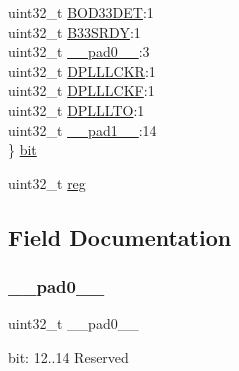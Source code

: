 \begin{DoxyCompactItemize}
\begin{tabbing}
\>uint32\_t \mbox{\hyperlink{union_s_y_s_c_t_r_l___i_n_t_e_n_s_e_t___type_afe0d01af66ae30fcd7f3c61067b2bef1}{BOD33DET}}:1\\
\>uint32\_t \mbox{\hyperlink{union_s_y_s_c_t_r_l___i_n_t_e_n_s_e_t___type_a001eb8c699a22ed1e8addd422b0068ae}{B33SRDY}}:1\\
\>uint32\_t \mbox{\hyperlink{union_s_y_s_c_t_r_l___i_n_t_e_n_s_e_t___type_a3e57c2ef1c3ffb36722f000cc1156824}{\_\_pad0\_\_}}:3\\
\>uint32\_t \mbox{\hyperlink{union_s_y_s_c_t_r_l___i_n_t_e_n_s_e_t___type_a0971d1b5df18859d93257da5c619eb64}{DPLLLCKR}}:1\\
\>uint32\_t \mbox{\hyperlink{union_s_y_s_c_t_r_l___i_n_t_e_n_s_e_t___type_ab73a8dbca12f32aad2cc241099afc49f}{DPLLLCKF}}:1\\
\>uint32\_t \mbox{\hyperlink{union_s_y_s_c_t_r_l___i_n_t_e_n_s_e_t___type_ac0397fe777ae420afce8c8ddc23dc843}{DPLLLTO}}:1\\
\>uint32\_t \mbox{\hyperlink{union_s_y_s_c_t_r_l___i_n_t_e_n_s_e_t___type_a6712ba6dd1d5b43d2d56ff8ac4e275a7}{\_\_pad1\_\_}}:14\\
\} \mbox{\hyperlink{union_s_y_s_c_t_r_l___i_n_t_e_n_s_e_t___type_ac90045c622fb8a197252a514063c5c84}{bit}}\\

\end{tabbing}\item 
uint32\+\_\+t \mbox{\hyperlink{union_s_y_s_c_t_r_l___i_n_t_e_n_s_e_t___type_a6b91636401516a477989a336376d7b40}{reg}}
\end{DoxyCompactItemize}


\subsection{Field Documentation}
\mbox{\label{union_s_y_s_c_t_r_l___i_n_t_e_n_s_e_t___type_a3e57c2ef1c3ffb36722f000cc1156824}} 
\subsubsection{\texorpdfstring{\_\_pad0\_\_}{\_\_pad0\_\_}}
{\footnotesize\ttfamily uint32\+\_\+t \+\_\+\+\_\+pad0\+\_\+\+\_\+}

bit\+: 12..14 Reserved \mbox{\label{union_s_y_s_c_t_r_l___i_n_t_e_n_s_e_t___type_a6712ba6dd1d5b43d2d56ff8ac4e275a7}} 
